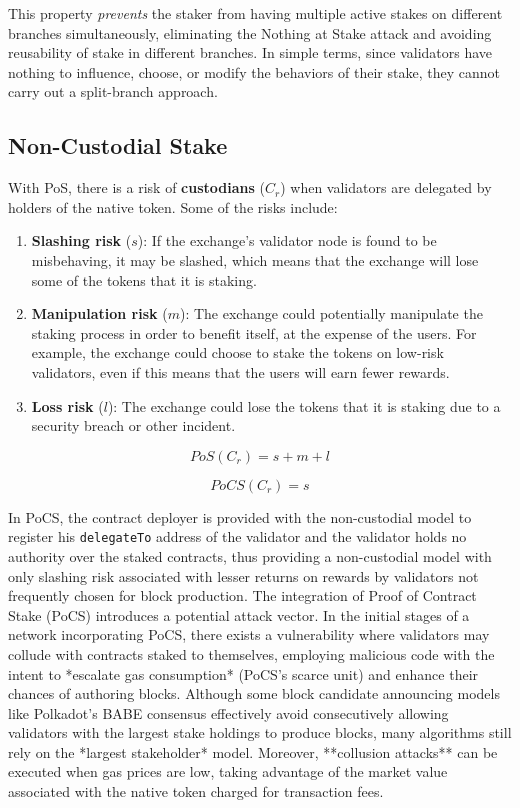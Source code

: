 \documentclass{article}
\begin{document}
This property \textit{prevents} the staker from having multiple active stakes on different branches simultaneously, eliminating the Nothing at Stake attack and avoiding reusability of stake in different branches. In simple terms, since validators have nothing to influence, choose, or modify the behaviors of their stake, they cannot carry out a split-branch approach.

\subsection{Non-Custodial Stake}

With PoS, there is a risk of \textbf{custodians} ($C_r$) when validators are delegated by holders of the native token. Some of the risks include:

\begin{enumerate}
    \item \textbf{Slashing risk} ($s$): If the exchange's validator node is found to be misbehaving, it may be slashed, which means that the exchange will lose some of the tokens that it is staking.
    \item \textbf{Manipulation risk} ($m$): The exchange could potentially manipulate the staking process in order to benefit itself, at the expense of the users. For example, the exchange could choose to stake the tokens on low-risk validators, even if this means that the users will earn fewer rewards.
    \item \textbf{Loss risk} ($l$): The exchange could lose the tokens that it is staking due to a security breach or other incident.
\end{enumerate}

$$PoS(C_r) = s + m + l$$

$$PoCS(C_r)=s$$

In PoCS, the contract deployer is provided with the non-custodial model to register his \texttt{delegateTo} address of the validator and the validator holds no authority over the staked contracts, thus providing a non-custodial model with only slashing risk associated with lesser returns on rewards by validators not frequently chosen for block production.
The integration of Proof of Contract Stake (PoCS) introduces a potential attack vector. In the initial stages of a network incorporating PoCS, there exists a vulnerability where validators may collude with contracts staked to themselves, employing malicious code with the intent to *escalate gas consumption* (PoCS's scarce unit) and enhance their chances of authoring blocks. Although some block candidate announcing models like Polkadot's BABE consensus effectively avoid consecutively allowing validators with the largest stake holdings to produce blocks, many algorithms still rely on the *largest stakeholder* model. Moreover, **collusion attacks** can be executed when gas prices are low, taking advantage of the market value associated with the native token charged for transaction fees.
\end{document}
